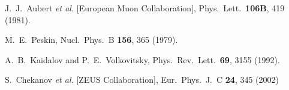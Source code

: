 \documentclass[10pt,prd,aps,nofootinbib,superscriptaddress]{revtex4}
\begin{document}
\begin{thebibliography}{99}
  J.~J.~Aubert {\it et al.} [European Muon Collaboration],
  Phys.\ Lett.\  {\bf 106B}, 419 (1981).
 
  M.~E.~Peskin,
  Nucl.\ Phys.\ B {\bf 156}, 365 (1979).
  
  A.~B.~Kaidalov and P.~E.~Volkovitsky,
  Phys.\ Rev.\ Lett.\  {\bf 69}, 3155 (1992).
 

  S.~Chekanov {\it et al.} [ZEUS Collaboration],
  Eur.\ Phys.\ J.\ C {\bf 24}, 345 (2002)

\end{thebibliography}
\end{document}
